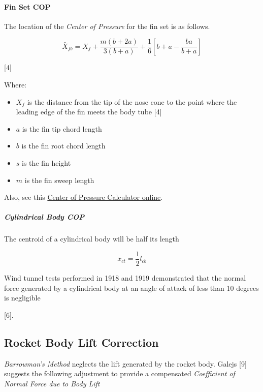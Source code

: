 \documentclass[]{article}
\providecommand{\tightlist}{%
  \setlength{\itemsep}{0pt}\setlength{\parskip}{0pt}}
\let\oldparagraph\paragraph
\renewcommand{\paragraph}[1]{\oldparagraph{#1}\mbox{}}
\let\oldsubparagraph\subparagraph
\renewcommand{\subparagraph}[1]{\oldsubparagraph{#1}\mbox{}}
\begin{document}
\paragraph{Fin Set COP}\label{fin-set-cop}

The location of the \emph{Center of Pressure} for the fin set is as
follows.

\begin{equation}
\label{eq_cop_fin_set}
\bar{X}_{fb}
= 
X_f 
+ 
\dfrac {m ( b + 2 a )} {3 ( b + a ) } 
+ \dfrac{1}{6} 
\left[ b + a - \dfrac{b a}{b + a} \right]
\end{equation}

{[}4{]}

Where:

\begin{itemize}
\tightlist
\item
  \(X_f\) is the distance from the tip of the nose cone to the point
  where the leading edge of the fin meets the body tube {[}4{]}
\item
  \(a\) is the fin tip chord length
\item
  \(b\) is the fin root chord length
\item
  \(s\) is the fin height
\item
  \(m\) is the fin sweep length
\end{itemize}

Also, see this
\href{http://physics.gallaudet.edu/tools/rocketcop.html}{Center of
Pressure Calculator online}.

\subparagraph{Cylindrical Body COP}\label{cylindrical-body-cop}

The centroid of a cylindrical body will be half its length

\begin{equation}
\label{eq_centroid_bodytube}
\bar{x}_{ct} = \dfrac{1}{2} l_{cb}
\end{equation}

Wind tunnel tests performed in 1918 and 1919 demonstrated that the
normal force generated by a cylindrical body at an angle of attack of
less than 10 degrees is negligible

{[}6{]}.

\subsection{Rocket Body Lift
Correction}\label{rocket-body-lift-correction}

\emph{Barrowman's Method} neglects the lift generated by the rocket
body. Galejs {[}9{]} suggests the following adjustment to provide a
compensated \emph{Coefficient of Normal Force due to Body Lift}
\end{document}
